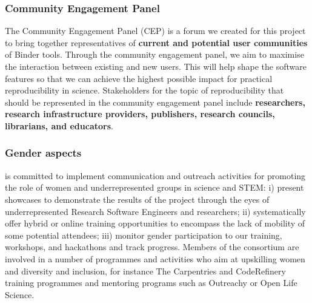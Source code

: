 \subsubsection{Community Engagement Panel}\label{sec:community-engagement-panel}
The Community Engagement Panel (CEP) is a forum we created for this project to bring together
representatives of \textbf{current and potential user communities} of Binder tools.
Through the community engagement panel, we aim to maximise the interaction between existing and new users.
This will help shape the software features so that we can
achieve the highest possible impact for practical reproducibility in science.
Stakeholders for the topic of reproducibility that should be represented in the
community engagement panel include \textbf{researchers, research infrastructure
providers, publishers, research councils, librarians, and educators}.



\subsubsection{Gender aspects}\label{sec:gender}





\TheProject is committed to implement communication and outreach activities for
promoting the role of women and underrepresented groups in science
and STEM: i) present showcases to demonstrate the results of the project through
the eyes of underrepresented Research Software Engineers and researchers; ii)
systematically offer hybrid or online training opportunities to encompass the
lack of mobility of some potential attendees; iii) monitor gender participation
to our training, workshops, and hackathons and track progress. Members of the
consortium are involved in a number of programmes and activities who aim at
upskilling women and diversity and inclusion, for instance The Carpentries and
CodeRefinery training programmes and mentoring programs such as Outreachy or
Open Life Science.

